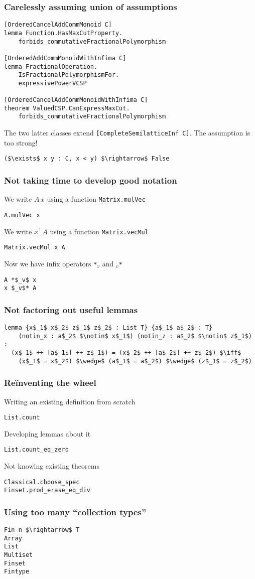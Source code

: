 \documentclass{beamer}
\begin{document}
\begin{frame}[fragile]
\frametitle{Carelessly assuming union of assumptions}
\begin{lstlisting}
[OrderedCancelAddCommMonoid C]
lemma Function.HasMaxCutProperty.
    forbids_commutativeFractionalPolymorphism

[OrderedAddCommMonoidWithInfima C]
lemma FractionalOperation.
    IsFractionalPolymorphismFor.
    expressivePowerVCSP

[OrderedCancelAddCommMonoidWithInfima C]
theorem ValuedCSP.CanExpressMaxCut.
    forbids_commutativeFractionalPolymorphism
\end{lstlisting}
The two latter classes extend \texttt{[CompleteSemilatticeInf C]}.
\pause
The assumption is too strong!
\begin{lstlisting}
($\exists$ x y : C, x < y) $\rightarrow$ False
\end{lstlisting}
\end{frame}

\begin{frame}[fragile]
\frametitle{Not taking time to develop good notation}
We write $A\,x$ using a function \texttt{Matrix.mulVec}
\begin{lstlisting}
A.mulVec x
\end{lstlisting}
We write $x^\top\!A$ using a function \texttt{Matrix.vecMul}
\begin{lstlisting}
Matrix.vecMul x A
\end{lstlisting}
\pause
\bigskip
Now we have infix operators \texttt{*$_v$} and \texttt{$_v$*}
\begin{lstlisting}
A *$_v$ x
x $_v$* A
\end{lstlisting}
\end{frame}

\begin{frame}[fragile]
\frametitle{Not factoring out useful lemmas}
\begin{lstlisting}
lemma {x$_1$ x$_2$ z$_1$ z$_2$ : List T} {a$_1$ a$_2$ : T}
    (notin_x : a$_2$ $\notin$ x$_1$) (notin_z : a$_2$ $\notin$ z$_1$) :
  (x$_1$ ++ [a$_1$] ++ z$_1$) = (x$_2$ ++ [a$_2$] ++ z$_2$) $\iff$
    (x$_1$ = x$_2$) $\wedge$ (a$_1$ = a$_2$) $\wedge$ (z$_1$ = z$_2$)
\end{lstlisting}
\end{frame}

\begin{frame}[fragile]
\frametitle{Reïnventing the wheel}
Writing an existing definition from scratch
\begin{lstlisting}
List.count
\end{lstlisting}
\pause
Developing lemmas about it
\begin{lstlisting}
List.count_eq_zero
\end{lstlisting}
\pause
Not knowing existing theorems
\begin{lstlisting}
Classical.choose_spec
Finset.prod_erase_eq_div
\end{lstlisting}
\end{frame}

\begin{frame}[fragile]
\frametitle{Using too many ``collection types''}
\begin{lstlisting}
Fin n $\rightarrow$ T
Array
List
Multiset
Finset
Fintype
\end{lstlisting}
\end{frame}
\end{document}
